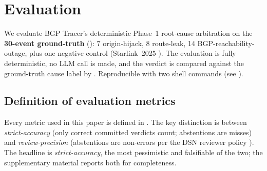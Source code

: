 
\section{Evaluation}
\label{sec:evaluation}

We evaluate BGP Tracer's deterministic Phase~1 root-cause
arbitration on the \textbf{30-event ground-truth}
(): 7 origin-hijack,
8 route-leak, 14 BGP-reachability-outage, plus one negative
control (Starlink~2025 ). The
evaluation is fully deterministic, no LLM call is made, and
the verdict is compared against the ground-truth cause label
by . Reproducible
with two shell commands (see ).

\subsection{Definition of evaluation metrics}
\label{sec:metrics-def}

Every metric used in this paper is defined in
. The key distinction is between
\emph{strict-accuracy} (only correct committed verdicts
count; abstentions are misses) and \emph{review-precision}
(abstentions are non-errors per the DSN reviewer policy
\cite{review-policy}). The headline is
\emph{strict-accuracy}, the most pessimistic and
falsifiable of the two; the supplementary material reports
both for completeness.

